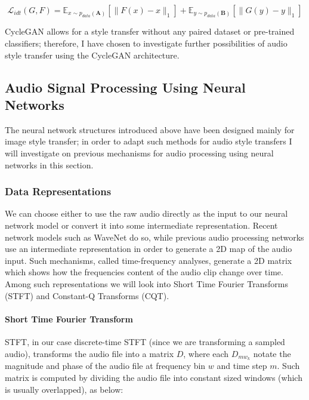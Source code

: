 \documentclass[]{article}
\begin{document}
\begin{equation}
    \mathcal{L}_{idt}(G, F) = \mathbb{E}_{x \sim p_{data}(\mathbf{A})}[\|F(x) - x\|_1] + \mathbb{E}_{y \sim p_{data}(\mathbf{B})}[\|G(y) - y\|_1]
\end{equation}

CycleGAN allows for a style transfer without any paired dataset or
pre-trained classifiers; therefore, I have chosen to investigate further
possibilities of audio style transfer using the CycleGAN architecture.

\hypertarget{audio-signal-processing-using-neural-networks}{%
\subsection{Audio Signal Processing Using Neural
Networks}\label{audio-signal-processing-using-neural-networks}}

The neural network structures introduced above have been designed mainly
for image style transfer; in order to adapt such methods for audio style
transfers I will investigate on previous mechanisms for audio processing
using neural networks in this section.

\hypertarget{data-representations}{%
\subsubsection{Data Representations}\label{data-representations}}

We can choose either to use the raw audio directly as the input to our
neural network model or convert it into some intermediate
representation. Recent network models such as WaveNet do so, while
previous audio processing networks use an intermediate representation in
order to generate a 2D map of the audio input. Such mechanisms, called
time-frequency analyses, generate a 2D matrix which shows how the
frequencies content of the audio clip change over time. Among such
representations we will look into Short Time Fourier Transforms (STFT)
and Constant-Q Transforms (CQT).

\paragraph{Short Time Fourier Transform}

STFT, in our case discrete-time STFT (since we are transforming a
sampled audio), transforms the audio file into a matrix \(D\), where
each \(D_{mw_{k}}\) notate the magnitude and phase of the audio file at
frequency bin \(w\) and time step \(m\). Such matrix is computed by
dividing the audio file into constant sized windows (which is usually
overlapped), as below:
\end{document}
